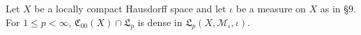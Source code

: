 Let $X$ be a locally compact Hausdorff space and let $\iota$ be a measure on $X$ as in §9. For $1 \leq p < \infty$, $\mathfrak{C}_{00}(X) \cap \mathfrak{L}_p$ is dense in $\mathfrak{L}_p(X, \mathcal{M}_\iota, \iota)$.
